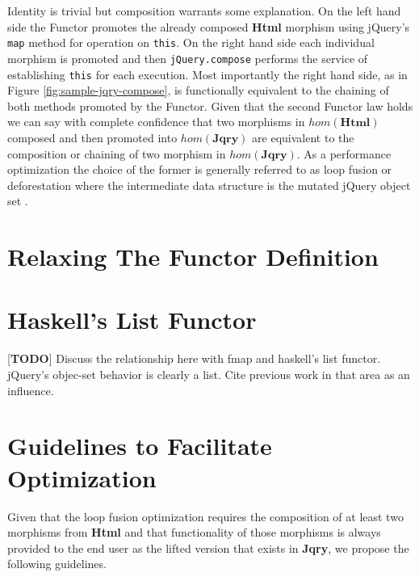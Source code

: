 \documentclass[preprint]{sigplanconf}
\begin{document}
Identity is trivial but composition warrants some explanation. On the left hand side the Functor promotes the already composed \textbf{Html} morphism using jQuery's \verb|map| method for operation on \verb|this|. On the right hand side each individual morphism is promoted and then \verb|jQuery.compose| performs the service of establishing \verb|this| for each execution. Most importantly the right hand side, as in Figure \ref{fig:sample-jqry-compose}, is functionally equivalent to the chaining of both methods promoted by the Functor. Given that the second Functor law holds we can say with complete confidence that two morphisms in \begin{math}hom(\mathbf{Html})\end{math} composed and then promoted into \begin{math}hom(\mathbf{Jqry})\end{math} are equivalent to the composition or chaining of two morphism in \begin{math}hom(\mathbf{Jqry})\end{math}. As a performance optimization the choice of the former is generally referred to as loop fusion or deforestation where the intermediate data structure is the mutated jQuery object set \cite{bib:deforestation}.

\section{Relaxing The Functor Definition}

\section{Haskell's List Functor}

[\textbf{TODO}] Discuss the relationship here with fmap and haskell's list functor. jQuery's objec-set behavior is clearly a list. Cite previous work in that area as an influence.

\section{Guidelines to Facilitate Optimization}

Given that the loop fusion optimization requires the composition of at least two morphisms from \textbf{Html} and that functionality of those morphisms is always provided to the end user as the lifted version that exists in \textbf{Jqry}, we propose the following guidelines.
\end{document}
